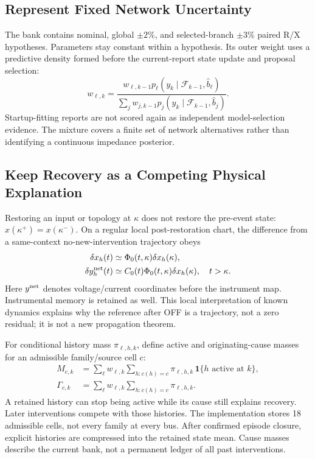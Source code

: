 \subsection{Represent Fixed Network Uncertainty}

The bank contains nominal, global $\pm2\%$, and selected-branch $\pm3\%$
paired R/X hypotheses. Parameters stay constant within a hypothesis. Its
outer weight uses a predictive density formed before the current-report
state update and proposal selection:
\begin{equation}
 w_{\ell,k}=\frac{w_{\ell,k-1}p_\ell(y_k\mid\mathcal F_{k-1},\widehat b_\ell)}
 {\sum_jw_{j,k-1}p_j(y_k\mid\mathcal F_{k-1},\widehat b_j)}.
 \label{eq:continuous-weights}
\end{equation}
Startup-fitting reports are not scored again as independent model-selection
evidence. The mixture covers a finite set of network alternatives rather
than identifying a continuous impedance posterior.

\subsection{Keep Recovery as a Competing Physical Explanation}

Restoring an input or topology at $\kappa$ does not restore the pre-event
state: $x(\kappa^+)=x(\kappa^-)$. On a regular local post-restoration chart,
the difference from a same-context no-new-intervention trajectory obeys
\begin{align}
 \delta x_h(t)&\simeq\Phi_0(t,\kappa)\delta x_h(\kappa),\nonumber\\
 \delta y_h^{\rm net}(t)&\simeq C_0(t)\Phi_0(t,\kappa)\delta x_h(\kappa),
 \quad t>\kappa.
 \label{eq:recovery-response}
\end{align}
Here $y^{\rm net}$ denotes voltage/current coordinates before the instrument map.
Instrumental memory is retained as well. This local interpretation of known
dynamics explains why the reference after OFF is a trajectory, not a zero
residual; it is not a new propagation theorem.

For conditional history mass $\pi_{\ell,h,k}$, define active and
originating-cause masses for an admissible family/source cell $c$:
\begin{align}
 M_{c,k}&=\sum_\ell w_{\ell,k}\sum_{h:c(h)=c}
       \pi_{\ell,h,k}\,\mathbf1\{h\text{ active at }k\},\nonumber\\
 \Gamma_{c,k}&=\sum_\ell w_{\ell,k}\sum_{h:c(h)=c}\pi_{\ell,h,k}.
 \label{eq:active-cause-masses}
\end{align}
A retained history can stop being active while its cause still explains
recovery. Later interventions compete with those histories. The
implementation stores 18 admissible cells, not every family at every bus.
After confirmed episode closure, explicit histories are compressed into
the retained state mean. Cause masses describe the current bank, not a
permanent ledger of all past interventions.


